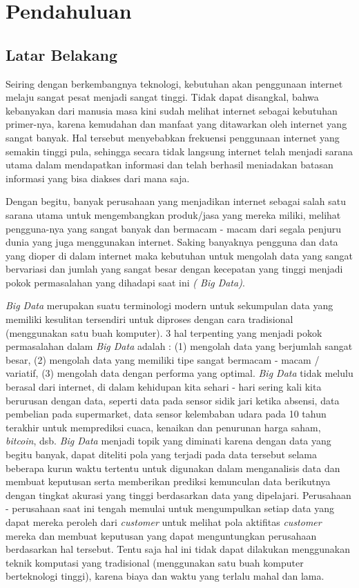 \chapter{Pendahuluan}

\section{Latar Belakang}
Seiring dengan berkembangnya teknologi, kebutuhan akan penggunaan internet melaju sangat pesat menjadi sangat tinggi. Tidak dapat disangkal, bahwa kebanyakan dari manusia masa kini sudah melihat internet sebagai kebutuhan primer-nya, karena kemudahan dan manfaat yang ditawarkan oleh internet yang sangat banyak. Hal tersebut menyebabkan frekuensi penggunaan internet yang semakin tinggi pula, sehingga secara tidak langsung internet telah menjadi sarana utama dalam mendapatkan informasi dan telah berhasil meniadakan batasan informasi yang bisa diakses dari mana saja.

Dengan begitu, banyak perusahaan yang menjadikan internet sebagai salah satu sarana utama untuk mengembangkan produk/jasa yang mereka miliki, melihat pengguna-nya yang sangat banyak dan bermacam - macam dari segala penjuru dunia yang juga menggunakan internet. Saking banyaknya pengguna dan data yang dioper di dalam internet maka kebutuhan untuk mengolah data yang sangat bervariasi dan jumlah yang sangat besar dengan kecepatan yang tinggi menjadi pokok permasalahan yang dihadapi saat ini \textit{( Big Data)}.

{\it Big Data} merupakan suatu terminologi modern untuk sekumpulan data yang memiliki kesulitan tersendiri untuk diproses dengan cara tradisional (menggunakan satu buah komputer).
3 hal terpenting yang menjadi pokok permasalahan dalam {\it Big Data} adalah : (1) mengolah data yang berjumlah sangat besar, (2) mengolah data yang memiliki tipe sangat bermacam - macam / variatif, (3) mengolah data dengan performa yang optimal. {\it Big Data} tidak melulu berasal dari internet, di dalam kehidupan kita sehari - hari sering kali kita berurusan dengan data, seperti data pada sensor sidik jari ketika absensi, data pembelian pada supermarket, data sensor kelembaban udara pada 10 tahun terakhir untuk memprediksi cuaca, kenaikan dan penurunan harga saham, {\it bitcoin}, dsb. {\it Big Data} menjadi topik yang diminati karena dengan data yang begitu banyak, dapat diteliti pola yang terjadi pada data tersebut selama beberapa kurun waktu tertentu untuk digunakan dalam menganalisis data dan membuat keputusan serta memberikan prediksi kemunculan data berikutnya dengan tingkat akurasi yang tinggi berdasarkan data yang dipelajari. Perusahaan - perusahaan saat ini tengah memulai untuk mengumpulkan setiap data yang dapat mereka peroleh dari {\it customer} untuk melihat pola aktifitas {\it customer} mereka dan membuat keputusan yang dapat menguntungkan perusahaan berdasarkan hal tersebut. Tentu saja hal ini tidak dapat dilakukan menggunakan teknik komputasi yang tradisional (menggunakan satu buah komputer berteknologi tinggi), karena biaya dan waktu yang terlalu mahal dan lama.

